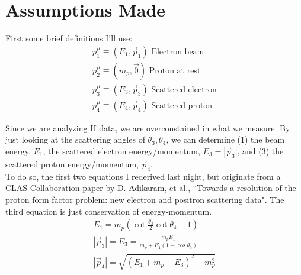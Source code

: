 \documentclass{article}
\begin{document}
\section*{Assumptions Made}
First some brief definitions I'll use:
\begin{equation*}
	\begin{gathered}
		p_1^\mu \equiv (E_1,\vec{p}_1)	\textrm{     Electron beam}	\\
		p_2^\mu \equiv (m_p,\vec{0} )	\textrm{     Proton at rest}	\\
		p_3^\mu \equiv (E_3,\vec{p}_3)	\textrm{     Scattered electron}	\\
		p_4^\mu \equiv (E_4,\vec{p}_4)		\textrm{     Scattered proton}
	\end{gathered}
\end{equation*}

Since we are analyzing H data, we are overconstained in what we measure. By just looking at the scattering angles of $\theta_3,\theta_4$, we can determine (1) the beam energy, $E_1$, the scattered electron energy/momentum, $E_3=|\vec{p}_3|$, and (3) the scattered proton energy/momentum, $\vec{p}_4$.\\		

To do so, the first two equations I rederived last night, but originate from a CLAS Collaboration paper by D. Adikaram, et al., ``Towards a resolution of the proton form factor problem: new electron and positron scattering data". The third equation is just conservation of energy-momentum.\\
\begin{equation*}
	\begin{gathered}
		E_1 = m_p ( \cot{\frac{\theta_3}{2}} \cot{\theta_4} - 1 )	\\
		|\vec{p}_3| = E_3 = \frac{ m_p E_1 }{ m_p + E_1 (1-\cos{\theta_3} )}	\\
		|\vec{p}_4| = \sqrt{(E_1 + m_p - E_3)^2 - m_p^2}
	\end{gathered}
\end{equation*}

\end{document}
